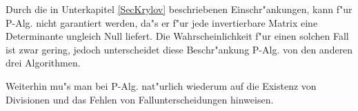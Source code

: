 Durch die in Unterkapitel \ref{SecKrylov} beschriebenen Einschr"ankungen,
kann f"ur P-Alg. nicht garantiert werden, da"s er f"ur jede invertierbare
Matrix eine Determinante ungleich Null liefert. Die Wahrscheinlichkeit f"ur
einen solchen Fall ist zwar gering, jedoch unterscheidet diese 
Beschr"ankung P-Alg. von den anderen drei Algorithmen.

Weiterhin mu"s man bei P-Alg. nat"urlich wiederum auf die Existenz von 
Divisionen und das Fehlen von Fallunterscheidungen hinweisen.

